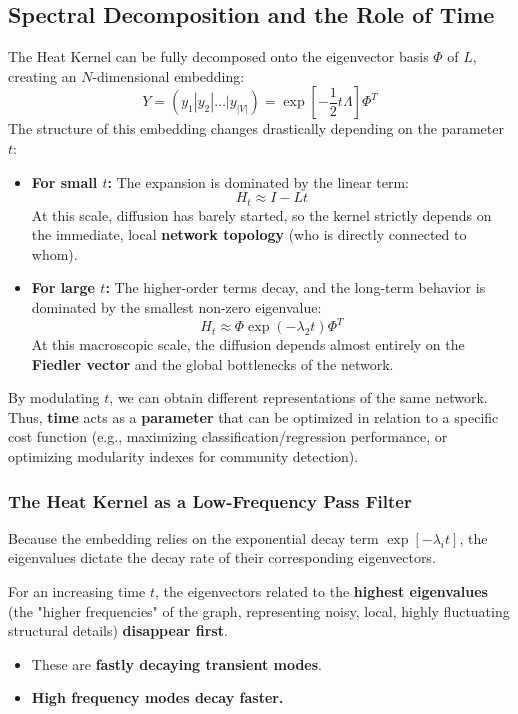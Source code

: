 \subsection{Spectral Decomposition and the Role of Time}

The Heat Kernel can be fully decomposed onto the eigenvector basis \( \Phi \) of \( L \), creating an \( N \)-dimensional embedding:
\[
    Y = (y_1 | y_2 | \dots | y_{|V|}) = \exp\left[-\frac{1}{2}t\Lambda\right] \Phi^T
\]
The structure of this embedding changes drastically depending on the parameter \( t \):
\begin{itemize}
    \item \textbf{For small \( t \):} The expansion is dominated by the linear term:
          \[
              H_t \approx I - Lt
          \]
          At this scale, diffusion has barely started, so the kernel strictly depends on the immediate, local \textbf{network topology} (who is directly connected to whom).

    \item \textbf{For large \( t \):} The higher-order terms decay, and the long-term behavior is dominated by the smallest non-zero eigenvalue:
          \[
              H_t \approx \Phi \exp(-\lambda_2 t) \Phi^T
          \]
          At this macroscopic scale, the diffusion depends almost entirely on the \textbf{Fiedler vector} and the global bottlenecks of the network.
\end{itemize}
By modulating \( t \), we can obtain different representations of the same network. Thus, \textbf{time} acts as a \textbf{parameter} that can be optimized in relation to a specific cost function (e.g., maximizing classification/regression performance, or optimizing modularity indexes for community detection).

\subsubsection{The Heat Kernel as a Low-Frequency Pass Filter}
Because the embedding relies on the exponential decay term \( \exp[-\lambda_i t] \), the eigenvalues dictate the decay rate of their corresponding eigenvectors.

For an increasing time \( t \), the eigenvectors related to the \textbf{highest eigenvalues} (the "higher frequencies" of the graph, representing noisy, local, highly fluctuating structural details) \textbf{disappear first}.
\begin{itemize}
    \item These are \textbf{fastly decaying transient modes}.
    \item \textbf{High frequency modes decay faster.}
\end{itemize}

